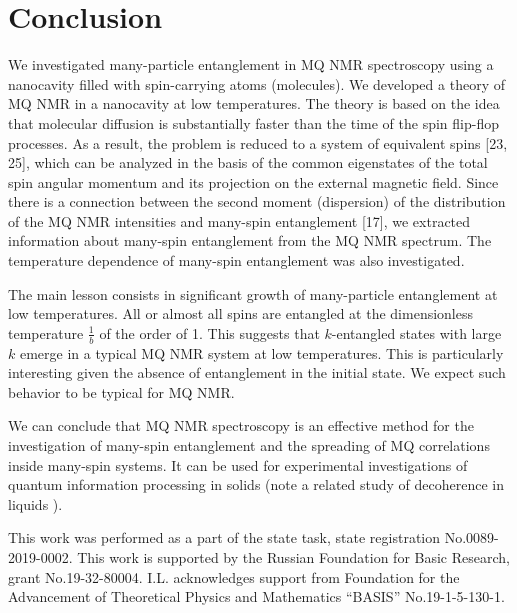 \documentclass[%
 reprint,
superscriptaddress,
 amsmath,amssymb,
]{revtex4-2}
\begin{document}
\section{Conclusion} 
\label{sec:conslusions}
We investigated many-particle entanglement in MQ NMR spectroscopy using a nanocavity filled with spin-carrying atoms (molecules). 
We developed a theory of MQ NMR in a nanocavity at low temperatures. 
The theory is based on the idea that  molecular diffusion is substantially faster than the time of the spin flip-flop processes. 
As a result, the problem is reduced to a system of equivalent spins [23, 25], which can be analyzed in the basis of the common eigenstates of the total spin angular momentum and its projection on the external magnetic field. 
Since there is a connection between the second moment (dispersion) of the distribution of the MQ NMR intensities and many-spin entanglement [17], we extracted information about many-spin entanglement from the MQ NMR spectrum. The temperature dependence of many-spin entanglement was also investigated.
\par
The main lesson consists in significant growth of many-particle entanglement at low temperatures. 
All or almost all spins are entangled at the dimensionless temperature $\frac{1}{b}$ of the order of 1. 
This suggests that $k$-entangled states with large $k$ emerge in a typical MQ NMR system at low temperatures. 
This is particularly interesting given the absence of entanglement in the initial state. We expect such behavior to be typical for MQ NMR. 
\par
We can conclude that MQ NMR spectroscopy is an effective method for the investigation of many-spin entanglement and the spreading of MQ correlations inside many-spin systems. It can be used for experimental investigations of quantum information processing in solids (note a related study of decoherence in liquids \cite{HOU2017863}).
\par 



\begin{acknowledgments}
This work was performed as a part of the state task, state registration No.0089-2019-0002. This work is supported by the Russian Foundation for Basic Research, grant No.19-32-80004. I.L. acknowledges support from Foundation for the Advancement of Theoretical Physics and Mathematics “BASIS” No.19-1-5-130-1.  
\end{acknowledgments}
\end{document}

